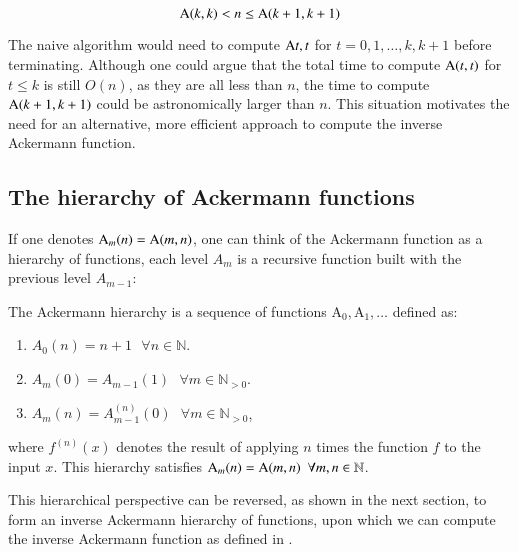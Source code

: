 \begin{equation}
\text{A}(k, k) < n \le \text{A}(k+1, k+1)
\end{equation}

The naive algorithm would need to compute $\text{A}{t, t}$ for $t = 0, 1, \ldots, k, k+1$ before terminating. Although one could argue that the total time to compute $\text{A}(t, t)$ for $t\le k$ is still $O(n)$, as they are all less than $n$, the time to compute $\text{A}(k+1, k+1)$ could be astronomically larger than $n$. This situation motivates the need for an alternative, more efficient approach to compute the inverse Ackermann function.

\subsection{The hierarchy of Ackermann functions}

If one denotes $\text{A}_m(n) = \text{A}(m, n)$, one can think of the Ackermann function as a hierarchy of functions, each level $A_m$ is a recursive function built with the previous level $A_{m-1}$:

\begin{defn} \label{defn: ack_hier}
	The Ackermann hierarchy is a sequence of functions $\text{A}_0, \text{A}_1, \ldots $ defined as:
	\begin{enumerate}
		\item $A_0(n) = n + 1 \ \ \ \forall n\in \mathbb{N}$.
		\item $A_m(0) = A_{m-1}(1) \ \ \ \forall m\in \mathbb{N}_{>0}$.
		\item $A_{m}(n) = A_{m-1}^{(n)}(0) \ \ \ \forall m\in \mathbb{N}_{>0}$,
	\end{enumerate}
	\noindent where $f^{(n)}(x)$ denotes the result of applying $n$ times the function $f$ to the input $x$. This hierarchy satisfies $\text{A}_m(n) = \text{A}(m, n) \ \ \forall m, n\in \mathbb{N}$.
\end{defn}

This hierarchical perspective can be reversed, as shown in the next section, to form an inverse Ackermann hierarchy of functions, upon which we can compute the inverse Ackermann function as defined in .